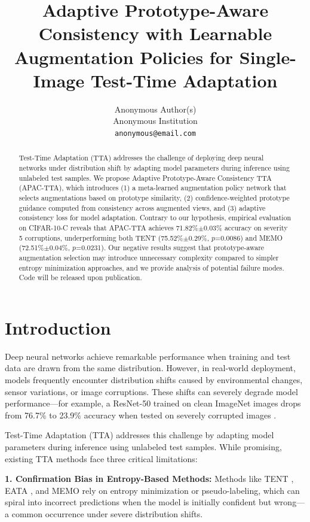\documentclass{article}
\title{Adaptive Prototype-Aware Consistency with Learnable Augmentation Policies for Single-Image Test-Time Adaptation}
\author{
Anonymous Author(s) \\
Anonymous Institution \\
\texttt{anonymous@email.com}
}
\begin{document}
\maketitle

\begin{abstract}
Test-Time Adaptation (TTA) addresses the challenge of deploying deep neural networks under distribution shift by adapting model parameters during inference using unlabeled test samples. We propose Adaptive Prototype-Aware Consistency TTA (APAC-TTA), which introduces (1) a meta-learned augmentation policy network that selects augmentations based on prototype similarity, (2) confidence-weighted prototype guidance computed from consistency across augmented views, and (3) adaptive consistency loss for model adaptation. Contrary to our hypothesis, empirical evaluation on CIFAR-10-C reveals that APAC-TTA achieves 71.82\%$\pm$0.03\% accuracy on severity 5 corruptions, underperforming both TENT (75.52\%$\pm$0.29\%, $p$=0.0086) and MEMO (72.51\%$\pm$0.04\%, $p$=0.0231). Our negative results suggest that prototype-aware augmentation selection may introduce unnecessary complexity compared to simpler entropy minimization approaches, and we provide analysis of potential failure modes. Code will be released upon publication.
\end{abstract}

\section{Introduction}

Deep neural networks achieve remarkable performance when training and test data are drawn from the same distribution. However, in real-world deployment, models frequently encounter distribution shifts caused by environmental changes, sensor variations, or image corruptions. These shifts can severely degrade model performance---for example, a ResNet-50 trained on clean ImageNet images drops from 76.7\% to 23.9\% accuracy when tested on severely corrupted images \citep{hendrycks2019benchmarking}.

Test-Time Adaptation (TTA) addresses this challenge by adapting model parameters during inference using unlabeled test samples. While promising, existing TTA methods face three critical limitations:

\textbf{1. Confirmation Bias in Entropy-Based Methods:} Methods like TENT \citep{wang2021tent}, EATA \citep{niu2022efficient}, and MEMO \citep{zhang2022memo} rely on entropy minimization or pseudo-labeling, which can spiral into incorrect predictions when the model is initially confident but wrong---a common occurrence under severe distribution shifts.
\end{document}
